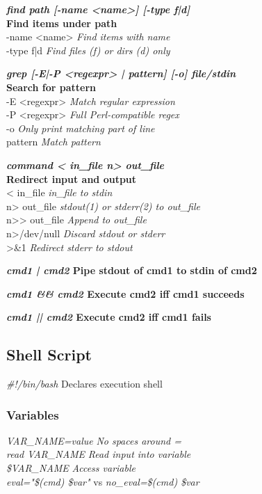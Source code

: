 \textbf{\emph{find path [-name <name>] [-type f|d]} \\\hfill Find items under path}\\
\quad -name <name> \hfill \textit{Find items with name}\\
\quad -type f|d \hfill \textit{Find files (f) or dirs (d) only}

\textbf{\emph{grep [-E|-P <regexpr> | pattern] [-o] file/stdin} \\\hfill Search for pattern}\\
\quad -E <regexpr> \hfill \textit{Match regular expression}\\
\quad -P <regexpr> \hfill \textit{Full Perl-compatible regex}\\
\quad -o \hfill \textit{Only print matching part of line}\\
\quad pattern \hfill \textit{Match pattern}

\textbf{\emph{command < in\_file n> out\_file} \\\hfill Redirect input and output}\\
\quad < in\_file \hfill \textit{in\_file to stdin}\\
\quad n> out\_file \hfill \textit{stdout(1) or stderr(2) to out\_file}\\
\quad n>{}> out\_file \hfill \textit{Append to out\_file}\\
\quad n>/dev/null \hfill \textit{Discard stdout or stderr}\\
>\&1 \hfill \textit{Redirect stderr to stdout}

\textbf{\emph{cmd1 | cmd2} \hfill Pipe stdout of cmd1 to stdin of cmd2}

\textbf{\emph{cmd1 \&\& cmd2} \hfill Execute cmd2 iff cmd1 succeeds}

\textbf{\emph{cmd1 || cmd2} \hfill Execute cmd2 iff cmd1 fails}

\subsection*{Shell Script}

\emph{\#!/bin/bash} \hfill Declares execution shell

\subsubsection*{Variables}

\emph{VAR\_NAME=value} \hfill \textit{No spaces around =}\\
\emph{read VAR\_NAME} \hfill \textit{Read input into variable}\\
\emph{\$VAR\_NAME} \hfill \textit{Access variable}\\
\emph{eval="\$(cmd) \$var"} vs \emph{no\_eval=\sq \$(cmd) \$var\sq}

